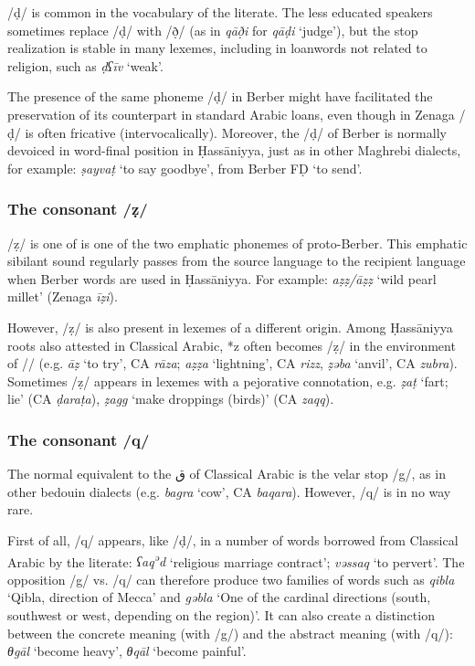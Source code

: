 \documentclass[output=paper]{langsci/langscibook}
\begin{document}
/ḍ/ is common in the vocabulary of the literate. The less educated speakers sometimes replace /ḍ/ with /ð̣/ (as in \textit{qāð̣i} for \textit{qāḍi} ‘judge’), but the stop realization is stable in many lexemes, including in loanwords not related to religion, such as \textit{ḍʕīv} ‘weak’.

The presence of the same phoneme /ḍ/ in Berber might have facilitated the preservation of its counterpart in standard Arabic loans, even though in Zenaga /ḍ/ is often fricative (intervocalically). Moreover, the /ḍ/ of Berber is normally devoiced in word-final position in Ḥassāniyya, just as in other Maghrebi dialects, for example: \textit{ṣayvaṭ} ‘to say goodbye’, from Berber FḌ ‘to send’.

\subsubsection{ The consonant /ẓ/} %
/ẓ/ is one of is one of the two emphatic phonemes of proto-Berber. This emphatic sibilant sound regularly passes from the source language to the recipient language when Berber words are used in Ḥassāniyya. For example: \textit{aẓẓ/āẓẓ} ‘wild pearl millet’ (Zenaga \textit{īẓi}).

However, /ẓ/ is also present in lexemes of a different origin. Among Ḥassāniyya roots also attested in Classical Arabic, *z often becomes /ẓ/ in the environment of /{\R}/ (e.g. \textit{{\R}āẓ} ‘to try’, CA \textit{rāza}; \textit{{\R}aẓẓa} ‘lightning’, CA \textit{rizz}, \textit{ẓəb{\R}a} ‘anvil’, CA \textit{zubra}). Sometimes /ẓ/ appears in lexemes with a pejorative connotation, e.g. \textit{ẓ{\R}aṭ} ‘fart; lie’ (CA \textit{ḍaraṭa}), \textit{ẓagg} ‘make droppings (birds)’ (CA \textit{zaqq}).

\subsubsection{ The consonant /q/} %
The normal equivalent to the ق of Classical Arabic is the velar stop /g/, as in other bedouin dialects (e.g. \textit{bagra} ‘cow’, CA \textit{baqara}). However, /q/ is in no way rare.

First of all, /q/ appears, like /ḍ/, in a number of words borrowed from Classical Arabic by the literate: \textit{ʕaq\textsuperscript{ə}}\textit{d} ‘religious marriage contract’; \textit{vəssaq} ‘to pervert’. The opposition /g/ vs. /q/ can therefore produce two families of words such as \textit{qibla} ‘Qibla, direction of Mecca’ and \textit{gəbla} ‘One of the cardinal directions (south, southwest or west, depending on the region)’. It can also create a distinction between the concrete meaning (with /g/) and the abstract meaning (with /q/): \textit{θgāl} ‘become heavy’, \textit{θqāl} ‘become painful’.
\end{document}
